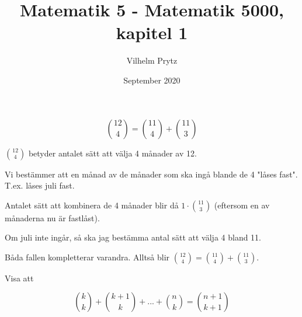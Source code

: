 \documentclass{article}
\title{Matematik 5 - Matematik 5000, kapitel 1}
\author{Vilhelm Prytz}
\date{September 2020}
\begin{document}
\maketitle

\setcounter{Exercise}{1195}
\begin{Exercise}

    \[
        \binom{12}{4} = \binom{11}{4} + \binom{11}{3}
    \]

    \( \binom{12}{4} \) betyder antalet sätt att välja 4 månader av 12.

    Vi bestämmer att en månad av de månader som ska ingå blande de 4 "låses fast". T.ex. låses juli fast.

    Antalet sätt att kombinera de 4 månader blir då \(1 \cdot \binom{11}{3}\) (eftersom en av månaderna nu är fastlåst).

    Om juli inte ingår, så ska jag bestämma antal sätt att välja 4 bland 11.

    Båda fallen kompletterar varandra. Alltså blir \( \binom{12}{4} = \binom{11}{4} + \binom{11}{3} \).

\end{Exercise}

\begin{Exercise}

    Visa att

    \[
        \binom{k}{k} + \binom{k+1}{k} + ... + \binom{n}{k} = \binom{n+1}{k+1}
    \]

\end{Exercise}
\end{document}
